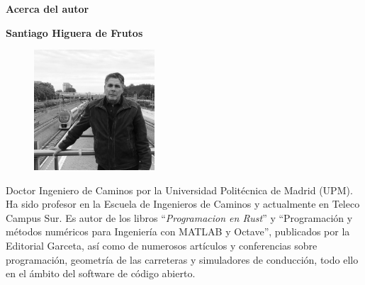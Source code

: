 \documentclass[11pt, table]{book}
\begin{document}
\blankpage


\dominitoc
\setcounter{tocdepth}{1} %
\pagestyle{indice}
\renewcommand{\thepage}{\roman{page}}
\setcounter{page}{7}
{\small
	\tableofcontents
}
\vfill\null
\pagebreak

\blankpage
\pagestyle{empty}

%

\vfill\null
\pagebreak

\thispagestyle{vacio}
{\centering \huge\textbf{Acerca del autor}\par}
\vspace{6em}

\begin{minipage}{0.9\textwidth}
	\setlength{\parindent}{0pt}
	
	{\centering\large\textbf{Santiago Higuera de Frutos} \par}
	\vspace{1em}
	
	\begin{figure} 
		\centering\vspace{-0.5\baselineskip}
		\includegraphics[width=0.4\textwidth]{img/FotoSantiago_bw.jpg}
	\end{figure}
	
	Doctor Ingeniero de Caminos por la Universidad Politécnica de Madrid (UPM). Ha sido profesor en la Escuela de Ingenieros de Caminos y actualmente en Teleco Campus Sur. Es autor de los libros ``\textit{Programacion en Rust}'' y  ``Programación y métodos numéricos para Ingeniería con MATLAB y Octave'', publicados por la Editorial Garceta, así como de numerosos artículos y conferencias sobre programación, geometría de las carreteras y simuladores de conducción, todo ello en el ámbito del software de código abierto. 
\end{minipage}
\end{document}
